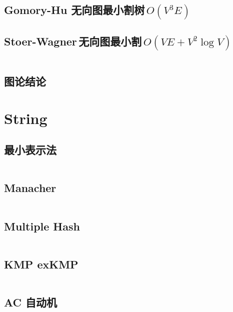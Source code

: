 \documentclass[titlepage, a4paper]{article}
\begin{document}
\begin{multicols}{2}
\begin{spacing}{0.6}
				\subsection{Gomory-Hu 无向图最小割树\,$O(V ^ 3 E)$}
				
				\subsection{Stoer-Wagner\,无向图最小割\,$O(VE + V ^ 2 \log V)$}
				\inputminted{cpp}{src/yzh/Stoer-Wagner.cpp}
				
				\subsection{图论结论}
				
				
				
				
				
			
			\section{String}
				\subsection{最小表示法}
				\inputminted{cpp}{src/String/最小表示法.cpp}
				\subsection{Manacher}
				\inputminted{cpp}{src/String/Manacher.cpp}
				\subsection{Multiple Hash}
				\inputminted{cpp}{src/String/hash.cpp}	
				\subsection{KMP exKMP}
				\inputminted{cpp}{src/String/KMP.cpp}
				\subsection{AC 自动机}
				\inputminted{cpp}{src/String/AC 自动机.cpp}

\end{spacing}
\end{multicols}
\end{document}
